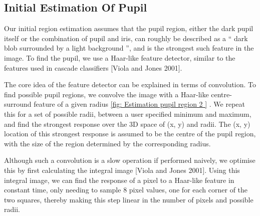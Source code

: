 \documentclass[12pt,fleqn]{book} %
\begin{document}
\subsection{Initial Estimation Of Pupil} 
Our initial region estimation assumes that the pupil region, either the dark pupil itself or the combination of pupil and iris, can roughly be described as a “ dark blob surrounded by a light background ”, and is the strongest such feature in the image. To find the pupil, we use a Haar-like feature detector, similar to the features used in cascade classifiers [Viola and Jones 2001]. \bigskip

The core idea of the feature detector can be explained in terms of convolution. To find possible pupil regions, we convolve the image with a Haar-like centre-surround feature of a given radius \ref{fig: Estimation pupil region 2 } . We repeat this for a set of possible radii, between a user specified minimum and maximum, and find the strongest response over the 3D space of (x, y) and radii. The (x, y) location of this strongest response is assumed to be the centre of the pupil region, with the size of the region determined by the corresponding radius. \bigskip

Although such a convolution is a slow operation if performed naively, we optimise this by first calculating the integral image [Viola and Jones 2001]. Using this integral image, we can find the response of a pixel to a Haar-like feature in constant time, only needing to sample 8 pixel values, one for each corner of the two squares, thereby making this step linear in the number of pixels and possible radii.












\printbibliography[]



\end{document}
